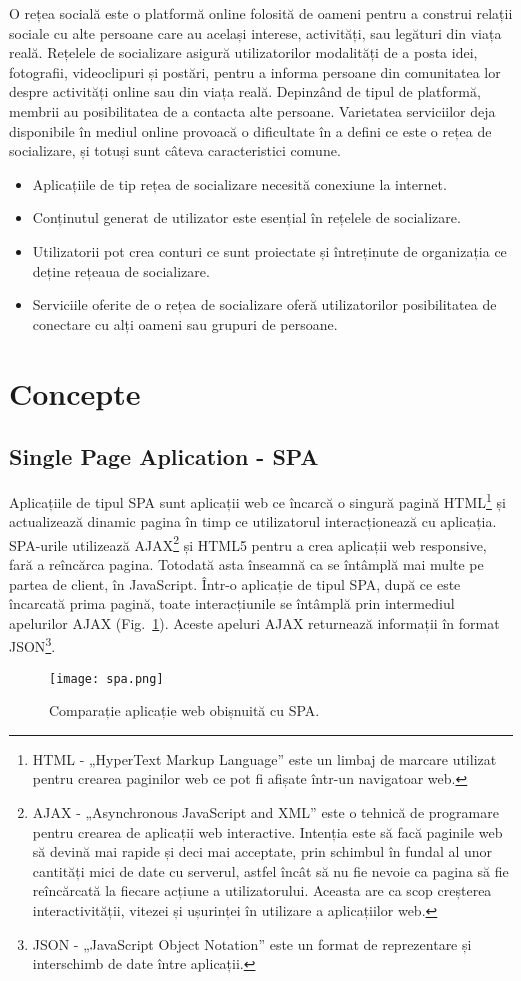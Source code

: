 O rețea socială este o platformă online folosită de oameni pentru a construi relații sociale cu alte persoane care au același interese,
activități, sau legături din viața reală. Rețelele de socializare asigură utilizatorilor modalități de a posta idei, fotografii, videoclipuri și postări, 
pentru a informa persoane din comunitatea lor despre activități online sau din viața reală. Depinzând de tipul de platformă, membrii au posibilitatea de 
a contacta alte persoane. Varietatea serviciilor deja disponibile în mediul online provoacă o dificultate în a defini ce este o rețea de socializare,
și totuși sunt câteva caracteristici comune\cite{SocialNetworks}.
\begin{itemize}
    \item Aplicațiile de tip rețea de socializare necesită conexiune la internet.
    \item Conținutul generat de utilizator este esențial în rețelele de socializare.
    \item Utilizatorii pot crea conturi ce sunt proiectate și întreținute de organizația ce deține rețeaua de socializare.
    \item Serviciile oferite de o rețea de socializare oferă utilizatorilor posibilitatea de conectare cu alți oameni sau grupuri de persoane.
\end{itemize}

\section{Concepte}
     \subsection{Single Page Aplication - SPA}
    Aplicațiile de tipul SPA sunt aplicații web ce încarcă o singură pagină HTML\footnote{HTML - „HyperText Markup Language” este un limbaj 
de marcare utilizat pentru crearea paginilor web ce pot fi afișate într-un navigatoar web.} și actualizează dinamic pagina în timp ce 
utilizatorul interacționează cu aplicația. SPA-urile utilizează AJAX\footnote{AJAX - „Asynchronous JavaScript and XML” este o tehnică 
de programare pentru crearea de aplicații web interactive. Intenția este să facă paginile web să devină mai rapide și deci mai acceptate, 
prin schimbul în fundal al unor cantități mici de date cu serverul, astfel încât să nu fie nevoie ca pagina să fie reîncărcată la 
fiecare acțiune a utilizatorului. Aceasta are ca scop creșterea interactivității, vitezei și ușurinței în utilizare a aplicațiilor web.} și HTML5 pentru a crea aplicații web responsive, fară a reîncărca pagina.
Totodată asta înseamnă ca se întâmplă mai multe pe partea de client, în JavaScript. Într-o aplicație de tipul SPA, după ce este încarcată
prima pagină, toate interacțiunile se întâmplă prin intermediul apelurilor AJAX (Fig.~\ref{fig:spa}). Aceste apeluri AJAX  returnează informații în format JSON\footnote{
JSON - „JavaScript Object Notation” este un format de reprezentare și interschimb de date între aplicații.}.
\begin{figure}[h]
\texttt{[image: spa.png]}
\centering
\caption{Comparație aplicație web obișnuită cu SPA.\cite{SPA}}
\label{fig:spa}
\end{figure} 
